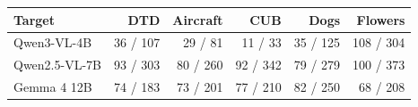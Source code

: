 \begin{tabular}{lrrrrr}
\toprule
Target & DTD & Aircraft & CUB & Dogs & Flowers \\
\midrule
Qwen3-VL-4B & 36 / 107 & 29 / 81 & 11 / 33 & 35 / 125 & 108 / 304 \\
Qwen2.5-VL-7B & 93 / 303 & 80 / 260 & 92 / 342 & 79 / 279 & 100 / 373 \\
Gemma 4 12B & 74 / 183 & 73 / 201 & 77 / 210 & 82 / 250 & 68 / 208 \\
\bottomrule
\end{tabular}
